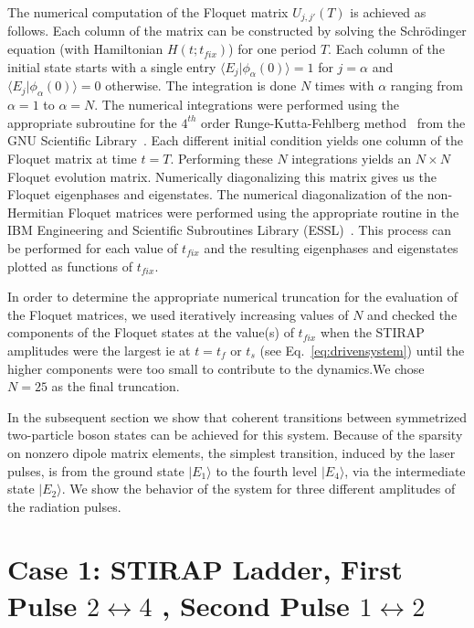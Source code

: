 \documentclass{article}
\begin{document}
The numerical computation of the Floquet matrix $U_{j,j'}(T)$  is achieved as follows. Each column of the matrix can be constructed by solving the Schr\"odinger equation (with Hamiltonian $H(t;t_{fix})$)  for one period $T$.  Each column of the initial state starts with a single entry ${\langle}E_j|\phi_{\alpha}(0)\rangle=1$  for $j=\alpha$ and ${\langle}E_j|\phi_{\alpha}(0)\rangle=0$ otherwise.  The integration is done $N$ times with $\alpha$ ranging from $\alpha=1$ to $\alpha=N$.  The numerical integrations were performed using the appropriate subroutine for the $4^{th}$ order Runge-Kutta-Fehlberg method~\cite{rkutta:pd} from the GNU Scientific Library~\cite{galassi:gsl}. Each different initial condition yields one column of the Floquet matrix at time $t=T$. Performing these $N$ integrations yields an $N{\times}N$ Floquet evolution matrix. Numerically diagonalizing this matrix gives us the Floquet eigenphases and eigenstates. The numerical diagonalization of the non-Hermitian Floquet matrices were performed using the appropriate routine in the IBM{\texttrademark}  Engineering and Scientific Subroutines Library (ESSL)~\cite{ibm:essl}. This process can be performed for each value of $t_{fix}$ and the resulting eigenphases and eigenstates plotted as functions of $t_{fix}$.

In order to determine the appropriate numerical truncation for the evaluation of the Floquet matrices, we used iteratively increasing values of $N$ and checked the components of the Floquet states at the value(s) of $t_{fix}$ when  the STIRAP amplitudes were the largest ie at $t=t_f$ or $t_s$ (see Eq.~\eqref{eq:drivensystem}) until the higher components were too small to contribute to the dynamics.We chose $N=25$ as the final truncation.

In the subsequent section we show that coherent  transitions between symmetrized two-particle boson states can be achieved for this  system. Because of the sparsity on nonzero dipole matrix elements, the simplest transition, induced by the laser pulses,  is from the ground state $|E_1{\rangle}$ to the fourth level $|E_4{\rangle}$, via the intermediate state $|E_2{\rangle}$.  We show the behavior of the system for three different amplitudes of the radiation pulses. 

%
%
\section{\label{sec:6} Case 1: STIRAP Ladder, First Pulse $2\leftrightarrow4$ , Second Pulse $1\leftrightarrow2$}
%
%
\end{document}
